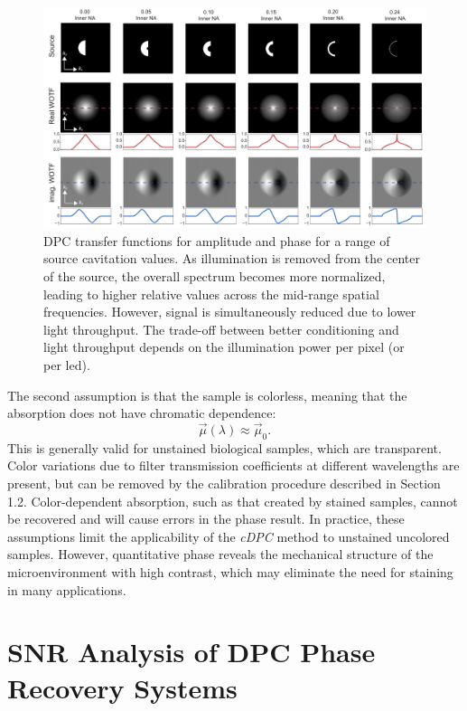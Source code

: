 \begin{figure}[tb]
    \centering
    \includegraphics[width=\textwidth]{figures/fig_phase_dpc_opt_transfer.pdf}
    \caption{\label{fig:phase:cavitated_transfer_functions}
    DPC transfer functions for amplitude and phase for a range of source cavitation values. As illumination is removed from the center of the source, the overall spectrum becomes more normalized, leading to higher relative values across the mid-range spatial frequencies. However, signal is simultaneously reduced due to lower light throughput. The trade-off between better conditioning and light throughput depends on the illumination power per pixel (or per led).}
\end{figure}

The second assumption is that the sample is colorless, meaning that the absorption does not have chromatic dependence:
\begin{equation} \label{outEq:monochrome}
\vec{\mu}(\lambda) \approx \vec{\mu}_0.
\end{equation}
\noindent This is generally valid for unstained biological samples, which are transparent. Color variations due to filter transmission coefficients at different wavelengths are present, but can be removed by the calibration procedure described in Section 1.2. Color-dependent absorption, such as that created by stained samples, cannot be recovered and will cause errors in the phase result. In practice, these assumptions limit the applicability of the \textit{cDPC} method to unstained uncolored samples. However, quantitative phase reveals the mechanical structure of the microenvironment with high contrast, which may eliminate the need for staining in many applications.

\section{SNR Analysis of DPC Phase Recovery Systems}

